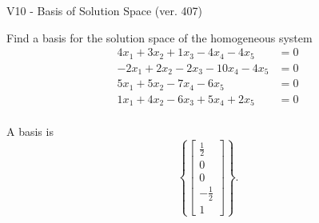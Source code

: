\begin{exercise}
  \begin{exerciseTitle}V10 - Basis of Solution Space (ver. 407)\end{exerciseTitle}
  \begin{exerciseStatement}
    Find a basis for the solution space of the homogeneous system 
\begin{align*}
 4 x_ 1 + 3 x_ 2 + 1 x_ 3 -4 x_ 4 -4 x_ 5 &= 0  \\ 
  -2 x_ 1 + 2 x_ 2 -2 x_ 3 -10 x_ 4 -4 x_ 5 &= 0  \\ 
  5 x_ 1 + 5 x_ 2 -7 x_ 4 -6 x_ 5 &= 0  \\ 
  1 x_ 1 + 4 x_ 2 -6 x_ 3 + 5 x_ 4 + 2 x_ 5 &= 0  \\ 
 \end{align*}


 
  \end{exerciseStatement}

  \begin{exerciseAnswer}
   A basis is   
\[\left\{\left[\begin{array}{c}
\frac{1}{2} \\
0 \\
0 \\
-\frac{1}{2} \\
1
\end{array}\right]\right\}.\]

  


  \end{exerciseAnswer}
\end{exercise}